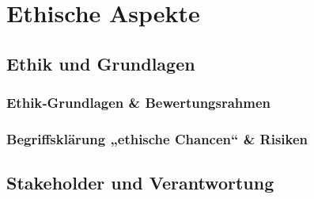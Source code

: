 \chapter{Ethische Aspekte}
\label{ethics} %



\section{Ethik und Grundlagen}
\subsection{Ethik‑Grundlagen \& Bewertungsrahmen}
\subsection{Begriffsklärung „ethische Chancen“ \& Risiken}

\section{Stakeholder und Verantwortung}
